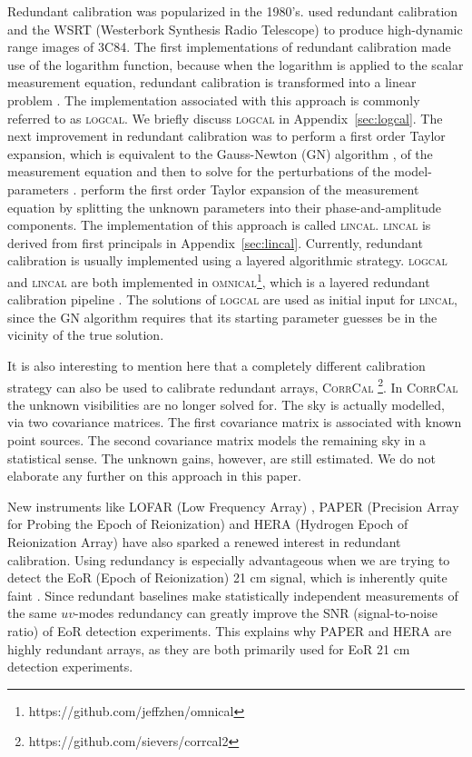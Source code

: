 \documentclass[useAMS,usenatbib]{mn2e}
\begin{document}
Redundant calibration was popularized in the 1980's. \citet{Noordam1982} used redundant calibration and the WSRT (Westerbork Synthesis Radio Telescope) to produce high-dynamic range images of 3C84.
The first implementations of redundant calibration made use of the logarithm function, because when the logarithm is applied to the scalar measurement equation, redundant 
calibration is transformed into a linear problem \citep{Wieringa1992,Camps2003,Liu2010}. The implementation associated with this approach is commonly referred to as \textsc{logcal}.
We briefly discuss \textsc{logcal} in Appendix~\ref{sec:logcal}. The next improvement in redundant calibration was to perform a first order Taylor expansion, which is equivalent to the Gauss-Newton (GN) algorithm \citep{Kurien2016}, of the measurement equation and then to solve for the
perturbations of the model-parameters \citep{Liu2010}. \citet{Liu2010} perform the first order Taylor expansion of the measurement equation by splitting the unknown parameters into their phase-and-amplitude
components. The implementation of  this approach is called \textsc{lincal}. \textsc{lincal} is derived from first principals in Appendix~\ref{sec:lincal}. 
Currently, redundant calibration is usually implemented using a layered algorithmic strategy. \textsc{logcal} and \textsc{lincal} are both implemented in \textsc{omnical}\footnote{https://github.com/jeffzhen/omnical}, which is a layered redundant calibration pipeline \citep{Zheng2014,Ali2015}.
The solutions of \textsc{logcal} are used as initial input for \textsc{lincal}, since the GN algorithm requires that its starting parameter guesses be in the vicinity 
of the true solution.

It is also interesting to mention here that a completely different calibration strategy can also be used to calibrate redundant arrays, \textsc{CorrCal} \citep{Sievers2017}\footnote{https://github.com/sievers/corrcal2}. In \textsc{CorrCal} the unknown 
visibilities are no longer solved for. The sky is actually modelled, via two covariance matrices. 
The first covariance matrix is associated with known point sources. The second covariance matrix models the remaining sky in a statistical sense. The unknown gains, however, are still 
estimated. We do not elaborate any further on this approach in this paper.

New instruments like LOFAR (Low Frequency Array) \citep{Noorishad2012}, PAPER (Precision Array for Probing the Epoch of Reionization) \citep{Ali2015} and HERA (Hydrogen Epoch of Reionization Array) \citep{deboer2015} have also sparked a renewed interest in redundant calibration. Using redundancy is especially advantageous when we are trying to detect the EoR (Epoch of Reionization) 21 cm signal,
which is inherently quite faint \citep{Parsons2012}. Since redundant baselines make statistically independent measurements of the same $uv$-modes redundancy can greatly 
improve the SNR (signal-to-noise ratio) of EoR detection experiments. This explains why PAPER and HERA are highly redundant arrays, as they are both primarily used for EoR 21 cm detection experiments.
\end{document}
